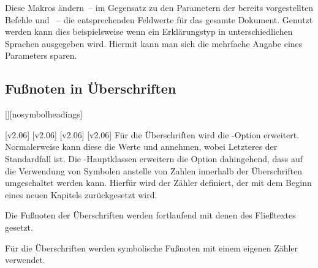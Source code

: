\begin{Declaration*}{}
\begin{Declaration*}{}
\begin{Declaration*}{}
\begin{Declaration}{}
\begin{Declaration}{}
\begin{Declaration}{}
\begin{Declaration}{}
\printdeclarationlist%
%
Diese Makros ändern~-- im Gegensatz zu den Parametern der bereits vorgestellten 
Befehle  und ~-- die entsprechenden 
Feldwerte für das gesamte Dokument. Genutzt werden kann dies beispielsweise 
wenn ein Erklärungstyp in unterschiedlichen Sprachen ausgegeben wird. Hiermit 
kann man sich die mehrfache Angabe eines Parameters sparen.
\end{Declaration}
\end{Declaration}
\end{Declaration}
\end{Declaration}
%
%


\subsection{Fußnoten in Überschriften}
\begin{Declaration}{[\PSet]}[nosymbolheadings]%
\begin{Declaration}[v2.02]{}%
\printdeclarationlist%
%
%
%
[v2.06]
[v2.06]
[v2.06]
[v2.06]
%
Für die Überschriften wird die \KOMAScript-Option  erweitert.
Normalerweise kann diese die Werte  und  
annehmen, wobei Letzteres der Standardfall ist. Die \TUDScript-Hauptklassen 
erweitern die Option dahingehend, dass auf die Verwendung von Symbolen anstelle 
von Zahlen innerhalb der Überschriften umgeschaltet werden kann. Hierfür wird 
der Zähler  definiert, der mit dem Beginn eines neuen 
Kapitels zurückgesetzt wird.
%
\begin{values}
\item[nosymbolheadings/numberheadings]
  Die Fußnoten der Überschriften werden fortlaufend mit denen des Fließtextes 
  gesetzt.
\item[symbolheadings]
  Für die Überschriften werden symbolische Fußnoten mit einem eigenen Zähler 
  verwendet.
\end{values}
\end{Declaration}
\end{Declaration}



\end{Declaration*}
\end{Declaration*}
\end{Declaration*}
